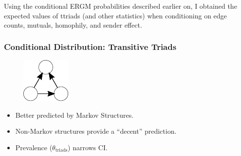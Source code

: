 \documentclass[aspectratio=169, 9pt]{beamer}
\begin{document}
\begin{frame}[c]
Using the conditional ERGM probabilities described earlier on, I obtained the expected values of ttriads (and other statistics) when conditioning on edge counts, mutuals, homophily, and sender effect.
\end{frame}



\begin{frame}[c,label=conditional-transitivity]
	\frametitle{Conditional Distribution: Transitive Triads}
\begin{minipage}[b]{.28\linewidth}
	\begin{figure}
		\includegraphics[width=.3\linewidth]{ttriad.pdf}
	\end{figure}
	\begin{itemize}[<+->]
		\item Better predicted by Markov Structures.
		\item Non-Markov structures provide a ``decent'' prediction.
		\item Prevalence ($\theta_{\mbox{triads}}$) narrows CI.
	\end{itemize}
\end{minipage}
\begin{minipage}[b]{.7\linewidth}
\begin{figure}
	\centering
	\def\svgwidth{.95\linewidth}
\end{figure}
\end{minipage}
\vfill\hfill
\hyperlink{conditional-mutual}{}
\end{frame}
\end{document}

